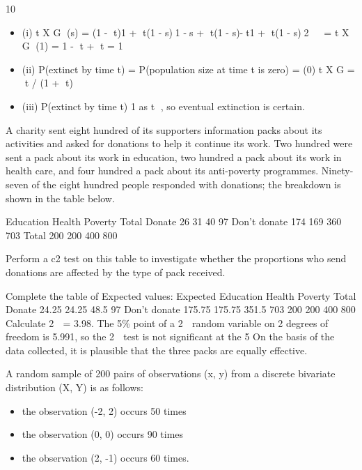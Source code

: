 \documentclass[a4paper,12pt]{article}
\begin{document}
10 

\begin{itemize}
    \item (i)
t
X G (s) = (1 - t){1 + t(1 - s)}1 -{s + t(1 - s)}{-t}{1 + t(1 - s)}2
  =
t
X G (1) = 1 - t + t = 1
\item (ii) P(extinct by time t) = P(population size at time t is zero)
= (0)
t
X G = t / (1 + t)
\item (iii) P(extinct by time t) 
 1 as t 
 , so eventual extinction is certain.
\end{itemize}

\newpage
\item A charity sent eight hundred of its supporters information packs about its activities and asked for donations to help it continue its work. Two hundred were sent a pack about its work in education, two hundred a pack about its
work in health care, and four hundred a pack about its anti-poverty programmes. Ninety-seven of the eight hundred people responded with donations; the breakdown is shown in the table below.

Education Health Poverty Total
Donate 26 31 40 97
Don’t donate 174 169 360 703
Total 200 200 400 800

Perform a c2 test on this table to investigate whether the proportions who
send donations are affected by the type of pack received. 

\medskip 
Complete the table of Expected values:
Expected Education Health Poverty Total
Donate 24.25 24.25 48.5 97
Don’t donate 175.75 175.75 351.5 703
200 200 400 800
Calculate 2
 = 3.98.
The 5\% point of a 2
 random variable on 2 degrees of freedom is 5.991,
so the 2
 test is not significant at the 5%
On the basis of the data collected, it is plausible that the three packs are equally
effective.
\newpage
\item A random sample of 200 pairs of observations (x, y) from a discrete bivariate
distribution (X, Y) is as follows:
\begin{itemize}
    \item the observation (-2, 2) occurs 50 times
\item the observation (0, 0) occurs 90 times
\item the observation (2, -1) occurs 60 times.
\end{itemize}
\end{document}
